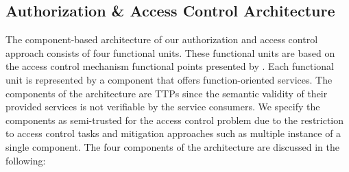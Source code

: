 \subsection{Authorization \& Access Control Architecture}
\label{sec:approach:sabaac:architecture}
The component-based architecture of our authorization and access control approach consists of four functional units.
These functional units are based on the access control mechanism functional points presented by \citeauthor{Hu2014} \cite{Hu2014}.
Each functional unit is represented by a component that offers function-oriented services.
The components of the architecture are TTPs since the semantic validity of their provided services is not verifiable by the service consumers.
We specify the components as semi-trusted for the access control problem due to the restriction to access control tasks and mitigation approaches such as multiple instance of a single component.
The four components of the architecture are discussed in the following:
